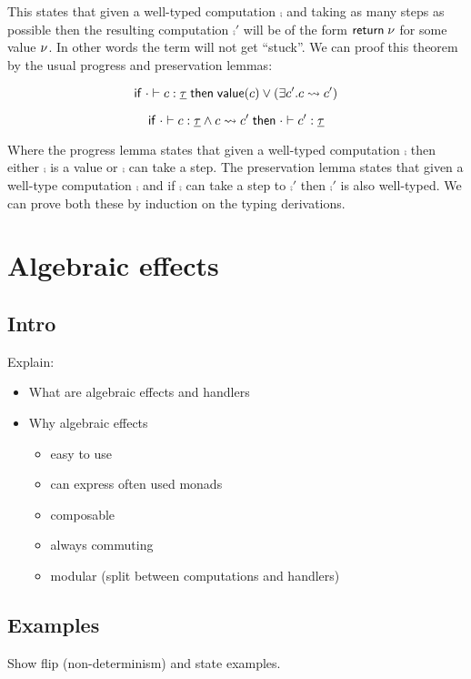 {This states that given a well-typed computation $\comp$ and taking as many steps as possible then the resulting computation $\comp'$ will be of the form
$\mathsf{return} \; \nu$ for some value $\nu$. In other words the term will not get ``stuck''.
We can proof this theorem by the usual progress and preservation lemmas:

\begin{lemma}[Progress]
\[
	\mathsf{if}\;
		\cdot \vdash c : \underline{\tau}
	\;\mathsf{then}\;
		\mathsf{value}(c)
		\lor
		(\exists c'. c \rightsquigarrow c')
\]
\end{lemma}

\begin{lemma}[Preservation]
\[
	\mathsf{if}\;
		\cdot \vdash c : \underline{\tau}
		\land
		c \rightsquigarrow c'
	\;\mathsf{then}\;
		\cdot \vdash c' : \underline{\tau}
\]
\end{lemma}

Where the progress lemma states that given a well-typed computation $\comp$ then either $\comp$ is a value or $\comp$ can take a  step. The preservation lemma states that given a well-type computation $\comp$ and if $\comp$ can take a step to $\comp'$ then $\comp'$ is also well-typed. We can prove both these by induction on the typing derivations.

\newpage
\section{Algebraic effects}

\subsection{Intro}
Explain:
\begin{itemize}
	\item What are algebraic effects and handlers
	\item Why algebraic effects
	\begin{itemize}
		\item easy to use
		\item can express often used monads
		\item composable
		\item always commuting
		\item modular (split between computations and handlers)
	\end{itemize}
\end{itemize}

\subsection{Examples}
Show flip (non-determinism) and state examples.

}
